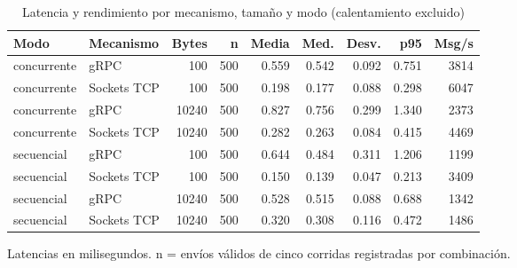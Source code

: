 \begin{table}[htbp]
\centering
\footnotesize
\setlength{\tabcolsep}{3pt}
\caption{Latencia y rendimiento por mecanismo, tamaño y modo (calentamiento excluido)}
\label{tab:resumen-latencia}
\begin{tabular}{@{}llrrrrrrr@{}}
\toprule
\textbf{Modo} & \textbf{Mecanismo} & \textbf{Bytes} & \textbf{n} & \textbf{Media} & \textbf{Med.} & \textbf{Desv.} & \textbf{p95} & \textbf{Msg/s} \\
\midrule
concurrente & gRPC & 100 & 500 & 0.559 & 0.542 & 0.092 & 0.751 & 3814 \\
concurrente & Sockets TCP & 100 & 500 & 0.198 & 0.177 & 0.088 & 0.298 & 6047 \\
concurrente & gRPC & 10240 & 500 & 0.827 & 0.756 & 0.299 & 1.340 & 2373 \\
concurrente & Sockets TCP & 10240 & 500 & 0.282 & 0.263 & 0.084 & 0.415 & 4469 \\
secuencial & gRPC & 100 & 500 & 0.644 & 0.484 & 0.311 & 1.206 & 1199 \\
secuencial & Sockets TCP & 100 & 500 & 0.150 & 0.139 & 0.047 & 0.213 & 3409 \\
secuencial & gRPC & 10240 & 500 & 0.528 & 0.515 & 0.088 & 0.688 & 1342 \\
secuencial & Sockets TCP & 10240 & 500 & 0.320 & 0.308 & 0.116 & 0.472 & 1486 \\
\bottomrule
\end{tabular}
\par\smallskip\footnotesize Latencias en milisegundos. n = envíos válidos de cinco corridas registradas por combinación.
\end{table}
